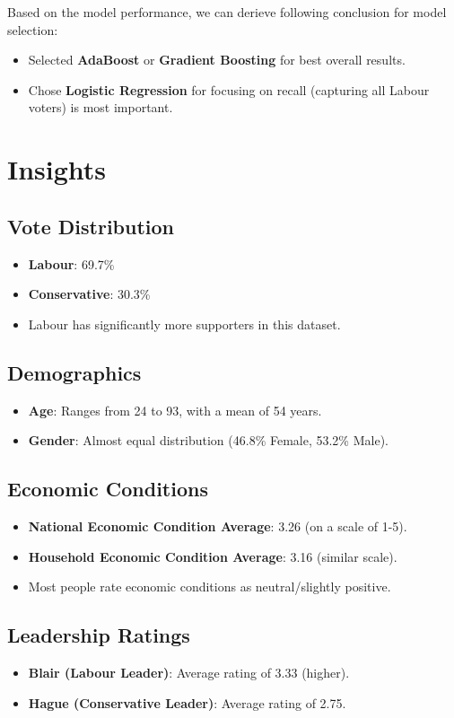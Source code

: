 \documentclass[12pt]{article}
\begin{document}
Based on the model performance, we can derieve following conclusion for model selection:
\begin{itemize}
    \item Selected \textbf{AdaBoost} or \textbf{Gradient Boosting} for best overall results.
    \item Chose \textbf{Logistic Regression} for focusing on recall (capturing all Labour voters) is most important.
\end{itemize}
\section{Insights}

\subsection{Vote Distribution}
\begin{itemize}
    \item \textbf{Labour}: 69.7\%
    \item \textbf{Conservative}: 30.3\%
    \item Labour has significantly more supporters in this dataset.
\end{itemize}

\subsection{Demographics}
\begin{itemize}
    \item \textbf{Age}: Ranges from 24 to 93, with a mean of 54 years.
    \item \textbf{Gender}: Almost equal distribution (46.8\% Female, 53.2\% Male).
\end{itemize}

\subsection{Economic Conditions}
\begin{itemize}
    \item \textbf{National Economic Condition Average}: 3.26 (on a scale of 1-5).
    \item \textbf{Household Economic Condition Average}: 3.16 (similar scale).
    \item Most people rate economic conditions as neutral/slightly positive.
\end{itemize}

\subsection{Leadership Ratings}
\begin{itemize}
    \item \textbf{Blair (Labour Leader)}: Average rating of 3.33 (higher).
    \item \textbf{Hague (Conservative Leader)}: Average rating of 2.75.
\end{itemize}
\end{document}
